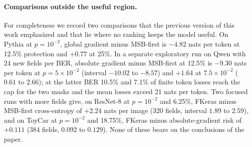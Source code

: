 \paragraph{Comparisons outside the useful region.} For completeness we record two comparisons that the previous version of this work emphasized and that lie where no ranking keeps the model useful. On Pythia at $p=10^{-2}$, global gradient minus MSB-first is $-4.82$ nats per token at 12.5\% protection and $+0.77$ at 25\%. In a separate exploratory run on Qwen with 24 new fields per BER, absolute gradient minus MSB-first at 12.5\% is $-9.30$ nats per token at $p=5\times10^{-2}$ (interval $-10.02$ to $-8.57$) and $+1.64$ at $7.5\times10^{-2}$ ($0.61$ to $2.66$); at the latter BER 10.5\% and 7.1\% of finite token losses reach the cap for the two masks and the mean losses exceed 21 nats per token. Two focused runs with more fields give, on ResNet-8 at $p=10^{-2}$ and 6.25\%, FKeras minus MSB-first cross-entropy of $+2.24$ nats per image (320 fields, interval $1.89$ to $2.59$), and on ToyCar at $p=10^{-2}$ and 18.75\%, FKeras minus absolute-gradient risk of $+0.111$ (384 fields, $0.092$ to $0.129$). None of these bears on the conclusions of the paper.

